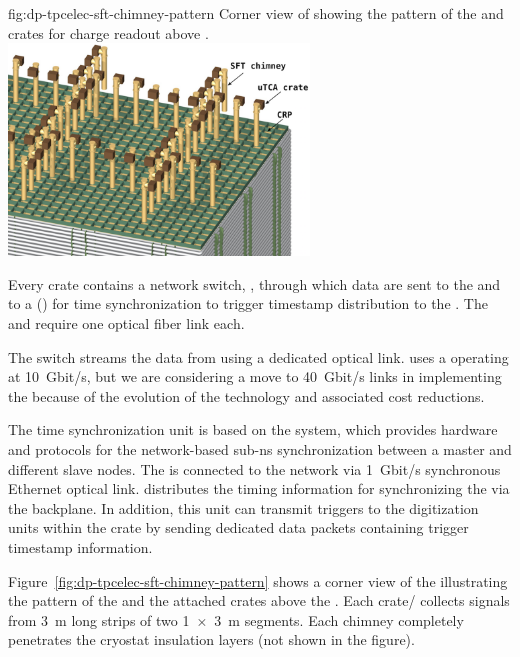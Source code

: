 \begin{dunefigure}{fig:dp-tpcelec-sft-chimney-pattern}
{Corner view of  showing the pattern of the  and  crates for charge readout above .}
\includegraphics[width=0.6\textwidth]{graphics/dp-tpcelec-sft-chimney-pattern}
\end{dunefigure}

Every  crate contains a network switch, , through which data are sent to the   and to a () for time synchronization to trigger timestamp distribution to the . %
The  and  require one optical fiber link each. 

The  switch streams the data from  using a dedicated optical link.  uses a  operating at \SI{10}{Gbit/s}, but we are considering a move to \SI{40}{Gbit/s} links in implementing the  because of the evolution of the technology and associated cost reductions.

The  time synchronization unit is based on the  system, which provides hardware and protocols for the network-based sub-\si{\nano\s} synchronization between a master and different slave nodes. The  is connected to the  network via \SI{1}{Gbit/s} synchronous Ethernet optical link.  distributes the timing information for synchronizing the  via the  backplane. In addition, this unit can transmit triggers to the digitization units within the crate by sending dedicated data packets containing trigger timestamp information. 

Figure~\ref{fig:dp-tpcelec-sft-chimney-pattern} shows a corner view of the  illustrating the pattern of the  and the attached  crates above the . Each crate/ collects signals from \SI{3}{\meter} long strips of two \SI[product-units=power]{1x3}{\meter}  segments. Each chimney completely %
penetrates the cryostat insulation layers (not shown in the figure). 

